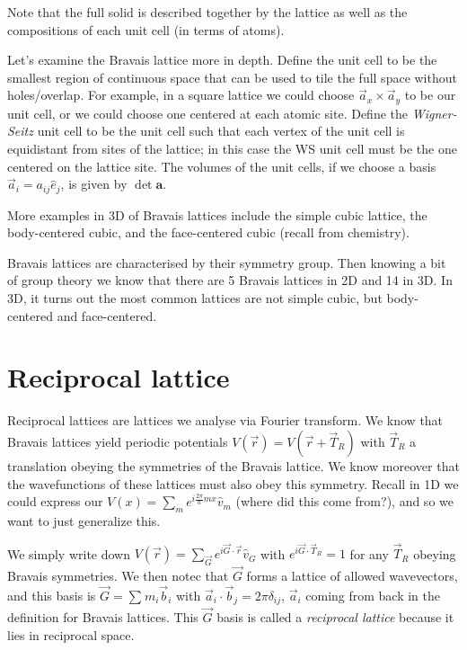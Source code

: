 \documentclass[10pt]{report}
\begin{document}
Note that the full solid is described together by the lattice as well as the compositions of each unit cell (in terms of atoms).

Let's examine the Bravais lattice more in depth. Define the unit cell to be the smallest region of continuous space that can be used to tile the full space without holes/overlap. For example, in a square lattice we could choose $\vec{a}_x \times \vec{a}_y$ to be our unit cell, or we could choose one centered at each atomic site. Define the \emph{Wigner-Seitz} unit cell to be the unit cell such that each vertex of the unit cell is equidistant from sites of the lattice; in this case the WS unit cell must be the one centered on the lattice site. The volumes of the unit cells, if we choose a basis $\vec{a}_i = a_{ij}\hat{e}_j$, is given by $\det \mathbf{a}$.

More examples in 3D of Bravais lattices include the simple cubic lattice, the body-centered cubic, and the face-centered cubic (recall from chemistry). 

Bravais lattices are characterised by their symmetry group. Then knowing a bit of group theory we know that there are 5 Bravais lattices in 2D and 14 in 3D. In 3D, it turns out the most common lattices are not simple cubic, but body-centered and face-centered.

\section{Reciprocal lattice}

Reciprocal lattices are lattices we analyse via Fourier transform. We know that Bravais lattices yield periodic potentials $V(\vec{r}) = V(\vec{r} + \vec{T}_R)$ with $\vec{T}_R$ a translation obeying the symmetries of the Bravais lattice. We know moreover that the wavefunctions of these lattices must also obey this symmetry. Recall in 1D we could express our $V(x) = \sum\limits_{m}^{}e^{i\frac{2\pi}{a}mx}\hat{v}_m$ (where did this come from?), and so we want to just generalize this.

We simply write down $V(\vec{r}) = \sum\limits_{\vec{G}}^{}e^{i\vec{G} \cdot \vec{r}}\hat{v}_G$ with $e^{i \vec{G} \cdot \vec{T}_R} = 1$ for any $\vec{T}_R$ obeying Bravais symmetries. We then notec that $\vec{G}$ forms a lattice of allowed wavevectors, and this basis is $\vec{G} = \sum\limits_{}^{}m_i \vec{b}_i$ with $\vec{a}_i  \cdot \vec{b}_j = 2\pi \delta_{ij}$, $\vec{a}_i$ coming from back in the definition for Bravais lattices. This $\vec{G}$ basis is called a \emph{reciprocal lattice} because it lies in reciprocal space.
\end{document}
